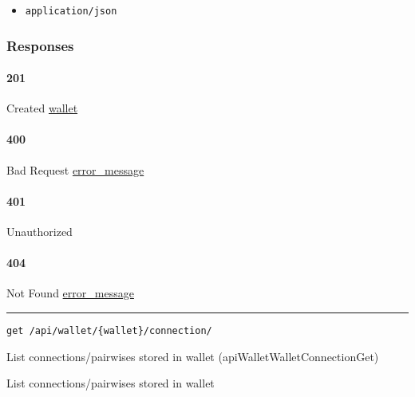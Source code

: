 \begin{itemize}
\tightlist
\item
  \texttt{application/json}
\end{itemize}

\hypertarget{responses-133}{%
\subsubsection{Responses}\label{responses-133}}

\hypertarget{section-434}{%
\paragraph{201}\label{section-434}}

Created \protect\hyperlink{wallet}{wallet}

\hypertarget{section-435}{%
\paragraph{400}\label{section-435}}

Bad Request \protect\hyperlink{error_message}{error\_message}

\hypertarget{section-436}{%
\paragraph{401}\label{section-436}}

Unauthorized \protect\hyperlink{}{}

\hypertarget{section-437}{%
\paragraph{404}\label{section-437}}

Not Found \protect\hyperlink{error_message}{error\_message}

\begin{center}\rule{0.5\linewidth}{\linethickness}\end{center}

\protect\hypertarget{apiWalletWalletConnectionGet}{}{}

\begin{verbatim}
get /api/wallet/{wallet}/connection/
\end{verbatim}

List connections/pairwises stored in wallet
({apiWalletWalletConnectionGet})

List connections/pairwises stored in wallet

